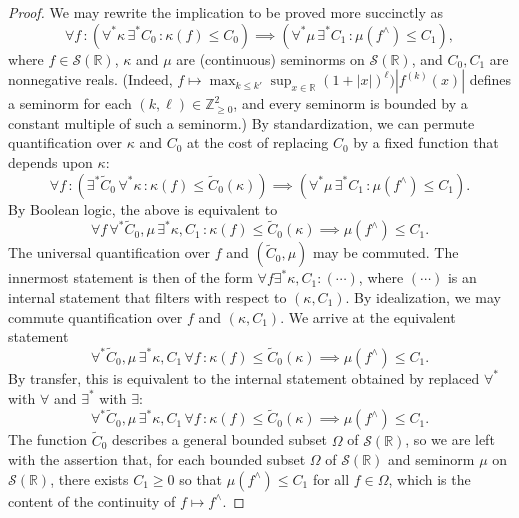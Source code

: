 \documentclass[reqno]{amsart}
\theoremstyle{plain} \newtheorem{theorem} {Theorem}
\theoremstyle{definition} \newtheorem{definition} [theorem] {Definition}
\theoremstyle{itplain} %
\numberwithin{equation}{section}
\numberwithin{theorem}{section}
\renewcommand{\geq}{\geqslant}
\renewcommand{\leq}{\leqslant}
\begin{document}
\begin{proof}
We may rewrite the implication to be proved more succinctly as
\begin{equation*}
  \forall f \,
  :  (
  \forall^* \kappa \, \exists^* C_0 \, :  \kappa(f) \leq C_0
  ) \implies
  (
  \forall^* \mu \, \exists^* C_1 \,  : \mu(f^\wedge) \leq C_1
  ),
\end{equation*}
where $f \in \mathcal{S}(\mathbb{R})$, $\kappa$ and $\mu$ are (continuous) seminorms on $\mathcal{S}(\mathbb{R})$, and $C_0, C_1$ are nonnegative reals.  (Indeed, $f \mapsto \max_{k \leq k'} \sup_{x \in \mathbb{R}} (1 + |x|)^{\ell}) |f^{(k)}(x)|$ defines a seminorm for each $(k,\ell) \in \mathbb{Z}_{\geq 0}^2$, and every seminorm is bounded by a constant multiple of such a seminorm.)  By standardization, we can permute quantification over $\kappa$ and $C_0$ at the cost of replacing $C_0$ by a fixed function that depends upon $\kappa$:
\begin{equation*}
  \forall f \,
  :  (
  \exists^* \tilde{C}_0 \, \forall^* \kappa \, : \kappa(f) \leq \tilde{C}_0(\kappa)
  ) \implies
  (
  \forall^* \mu \, \exists^* C_1 \, :  \mu(f^\wedge) \leq C_1
  ).
\end{equation*}
By Boolean logic, the above is equivalent to
\begin{equation*}
  \forall f \, \forall^* \tilde{C}_0, \mu \, \exists^* \kappa, C_1 \, 
  : \kappa(f) \leq \tilde{C}_0(\kappa)
  \implies \mu(f^\wedge) \leq C_1.
\end{equation*}
The universal quantification over $f$ and $(\tilde{C}_0, \mu)$ may be commuted.  The innermost statement is then of the form $\forall f \exists^* \kappa, C_1 : (\dotsb)$, where $(\dotsb)$ is an internal statement that filters with respect to $(\kappa,C_1)$.  By idealization, we may commute quantification over $f$ and $(\kappa,C_1)$.  We arrive at the equivalent statement
\begin{equation*}
  \forall^* \tilde{C}_0, \mu \, \exists^* \kappa, C_1 \,
  \forall f \, 
  : \kappa(f) \leq \tilde{C}_0(\kappa)
  \implies \mu(f^\wedge) \leq C_1.
\end{equation*}
By transfer, this is equivalent to the internal statement obtained by replaced $\forall^*$ with $\forall$ and $\exists^*$ with $\exists$:
\begin{equation*}
  \forall^* \tilde{C}_0, \mu \, \exists^* \kappa, C_1 \,
  \forall f \, 
  : \kappa(f) \leq \tilde{C}_0(\kappa)
  \implies \mu(f^\wedge) \leq C_1.
\end{equation*}
The function $\tilde{C}_0$ describes a general bounded subset $\Omega$ of $\mathcal{S}(\mathbb{R})$, so we are left with the assertion that, for each bounded subset $\Omega$ of $\mathcal{S}(\mathbb{R})$ and seminorm $\mu$ on $\mathcal{S}(\mathbb{R})$, there exists $C_1 \geq 0$ so that $\mu(f^\wedge) \leq C_1$ for all $f \in \Omega$, which is the content of the continuity of $f \mapsto f^\wedge$.
\end{proof}
\end{document}
